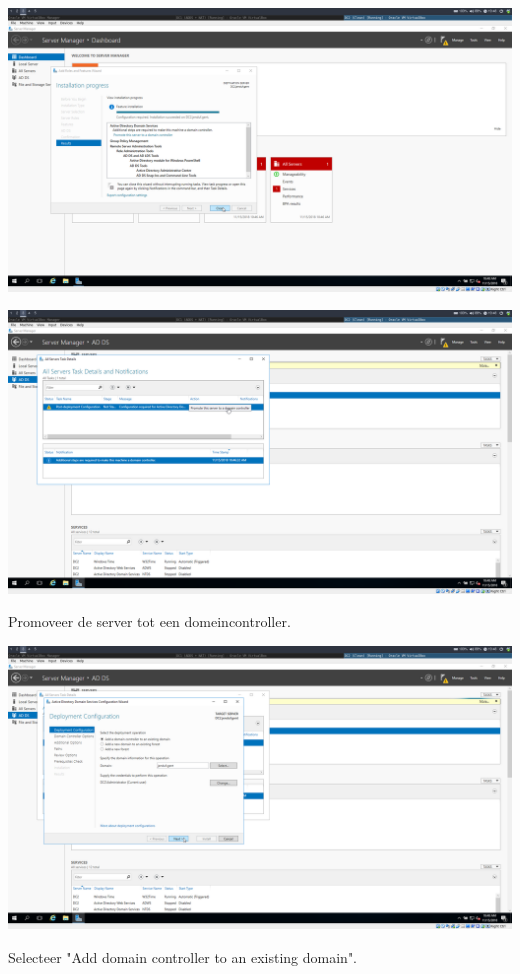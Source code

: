 \documentclass[a4paper]{article}
\begin{document}
\begin{center}
	\includegraphics[width=15cm]{Pictures/DC2/ADDS/1542307695.png}
\end{center}
\begin{center}
	\includegraphics[width=15cm]{Pictures/DC2/ADDS/1542307706.png}
	
	Promoveer de server tot een domeincontroller.
\end{center}
\begin{center}
	\includegraphics[width=15cm]{Pictures/DC2/ADDS/1542307727.png}
	
	Selecteer "Add domain controller to an existing domain".
\end{center}
\end{document}
